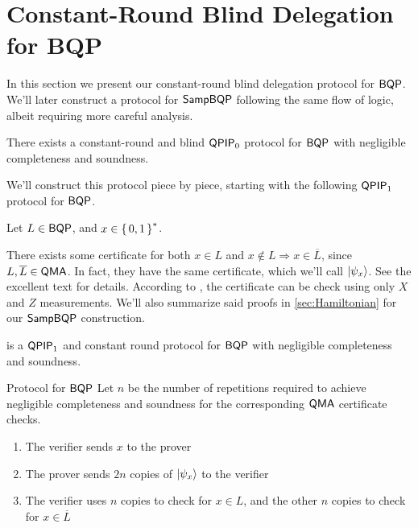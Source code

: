 \section{Constant-Round Blind Delegation for BQP}
\label{sec:BlindBQP}

In this section we present our constant-round blind delegation protocol for $\operatorname{\mathsf{BQP}}$.
We'll later construct a protocol for $\operatorname{\mathsf{SampBQP}}$ following the same flow of logic, albeit requiring more careful analysis.

\begin{thm}
	There exists a constant-round and blind $\operatorname{\mathsf{QPIP}}_0$ protocol for $\operatorname{\mathsf{BQP}}$ with negligible completeness and soundness.
\end{thm}

We'll construct this protocol piece by piece, starting with the following $\operatorname{\mathsf{QPIP}}_1$ protocol for $\operatorname{\mathsf{BQP}}$.

Let $L\in\operatorname{\mathsf{BQP}}$, and $x\in\set{0,1}^*$.

There exists some certificate for both $x\in L$ and $x\notin L\Rightarrow x\in\overline{L}$, since $L, \overline{L}\in\operatorname{\mathsf{QMA}}$.
In fact, they have the same certificate, which we'll call $\ket{\psi_x}$. See the excellent text \cite{kitaev2002classical} for details.
According to \cite{PhysRevA.93.022326}, the certificate can be check using only $X$ and $Z$ measurements.
We'll also summarize said proofs in \cref{sec:Hamiltonian} for our $\operatorname{\mathsf{SampBQP}}$ construction.

\begin{thm}
	 is a $\operatorname{\mathsf{QPIP}}_1$ and constant round protocol for $\operatorname{\mathsf{BQP}}$ with negligible completeness and soundness.
\end{thm}

\begin{protocol}{Protocol for $\operatorname{\mathsf{BQP}}$}
	\label{proto:BQP}
	Let $n$ be the number of repetitions required to achieve negligible completeness and soundness for the corresponding $\operatorname{\mathsf{QMA}}$ certificate checks.
	\begin{enumerate}
		\item The verifier sends $x$ to the prover
		\item The prover sends $2n$ copies of $\ket{\psi_x}$ to the verifier
		\item The verifier uses $n$ copies to check for $x\in L$, and the other $n$ copies to check for $x\in\overline{L}$
	\end{enumerate}
\end{protocol}

